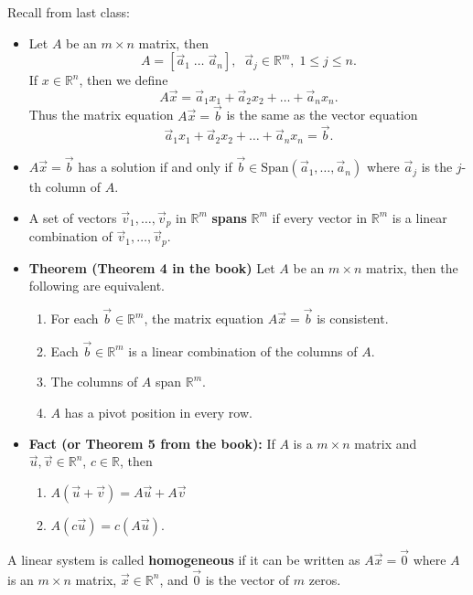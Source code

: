 \documentclass[12pt,letterpaper]{article}
\begin{document}
\thispagestyle{fancy}


Recall from last class:

\begin{itemize}

\item Let $A$ be an $m \times n$ matrix, then $$A = [ \vec{a}_1\; \dots \; \vec{a}_n], \; \; \vec{a}_j \in \mathbb{R}^m,\; 1\leq j \leq n.$$  
If $x \in \mathbb{R}^n$, then we define $$A \vec{x} = \vec{a}_1 x_1 + \vec{a}_2 x_2 +\dots + \vec{a}_n x_n.$$ Thus the matrix equation $A\vec{x} =\vec{b}$ is the same as the vector equation $$\vec{a}_1 x_1 + \vec{a}_2 x_2 +\dots + \vec{a}_n x_n=\vec{b}.$$
\item $A\vec{x} =\vec{b}$ has a solution if and only if $\vec{b} \in \text{Span}(\vec{a}_1,\dots, \vec{a}_n)$ where $\vec{a}_j$ is the $j$-th column of $A$.
\item A set of vectors $\vec{v}_1, \dots, \vec{v}_p$ in $\mathbb{R}^m$ {\bf spans} $\mathbb{R}^m$ if every vector in $\mathbb{R}^m$ is a linear combination of $\vec{v}_1, \dots, \vec{v}_p$.
\item {\bf Theorem (Theorem 4 in the book)} Let $A$ be an $m \times n$ matrix, then the following are equivalent.
\begin{enumerate}
\item For each $\vec{b} \in \mathbb{R}^m$, the matrix equation $A \vec{x} =\vec{b}$ is consistent.
\item Each $\vec{b} \in \mathbb{R}^m$ is a linear combination of the columns of $A$.
\item The columns of $A$ span $\mathbb{R}^m$.
\item $A$ has a pivot position in every row.
\end{enumerate}
\item {\bf Fact (or Theorem 5 from the book):} If $A$ is a $m \times n$ matrix and $\vec{u}, \vec{v} \in \mathbb{R}^n$, $c\in \mathbb{R}$, then
\begin{enumerate}
\item $A(\vec{u} +\vec{v})=A\vec{u} +A\vec{v}$
\item $A(c \vec{u}) =c (A\vec{u}).$
\end{enumerate}
\end{itemize}

\newpage


\begin{defn}
A linear system is called {\bf homogeneous} if it can be written as $A\vec{x}=\vec{0}$ where $A$ is an $m \times n$ matrix, $\vec{x} \in \mathbb{R}^n$, and $\vec{0}$ is the vector of $m$ zeros. 
\end{defn}
\end{document}
